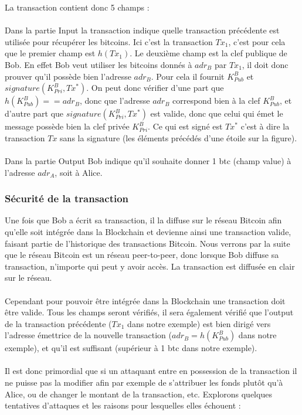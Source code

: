\documentclass[11pt,a4paper]{article}
\begin{document}
\noindent La transaction contient donc 5 champs :\\\\
Dans la partie Input la transaction indique quelle transaction précédente est utilisée pour récupérer les bitcoins. Ici c'est la transaction $Tx_1$, c'est pour cela que le premier champ est $h(Tx_1)$. Le deuxième champ est la clef publique de Bob. En effet Bob veut utiliser les bitcoins donnés à $adr_B$ par $Tx_1$, il doit donc prouver qu'il possède bien l'adresse $adr_B$. Pour cela il fournit 
$K_{Pub}^{B}$ et $signature(K_{Pri}^{B}, Tx^*)$. On peut donc vérifier d'une part que $h(K_{Pub}^{B}) == adr_B$, donc que l'adresse $adr_B$ correspond bien à la clef $K_{Pub}^{B}$, et d'autre part que $signature(K_{Pri}^{B}, Tx^*)$ est valide, donc que celui qui émet le message possède bien la clef privée $K_{Pri}^{B}$. Ce qui est signé est $Tx^*$ c'est à dire la transaction $Tx$ sans la signature (les éléments précédés d'une étoile sur la figure).\\\\
Dans la partie Output Bob indique qu'il souhaite donner 1 btc (champ value) à l'adresse $adr_A$, soit à Alice.

\subsubsection{Sécurité de la transaction}

Une fois que Bob a écrit sa transaction, il la diffuse sur le réseau Bitcoin afin qu'elle soit intégrée dans la Blockchain et devienne ainsi une transaction valide, faisant partie de l'historique des transactions Bitcoin. Nous verrons par la suite que le réseau Bitcoin est un réseau peer-to-peer, donc lorsque Bob diffuse sa transaction, n'importe qui peut y avoir accès. La transaction est diffusée en clair sur le réseau.\\\\
Cependant pour pouvoir être intégrée dans la Blockchain une transaction doit être valide. Tous les champs seront vérifiés, il sera également vérifié que l'output de la transaction précédente ($Tx_1$ dans notre exemple) est bien dirigé vers l'adresse émettrice de la nouvelle transaction 
($adr_B=h(K_{Pub}^{B})$ dans notre exemple), et qu'il est suffisant (supérieur à 1 btc dans notre exemple).
\\\\
Il est donc primordial que si un attaquant entre en possession de la transaction il ne puisse pas la modifier afin par exemple de s'attribuer les fonds plutôt qu'à Alice, ou de changer le montant de la transaction, etc. Explorons quelques tentatives d'attaques et les raisons pour lesquelles elles échouent :
\end{document}
